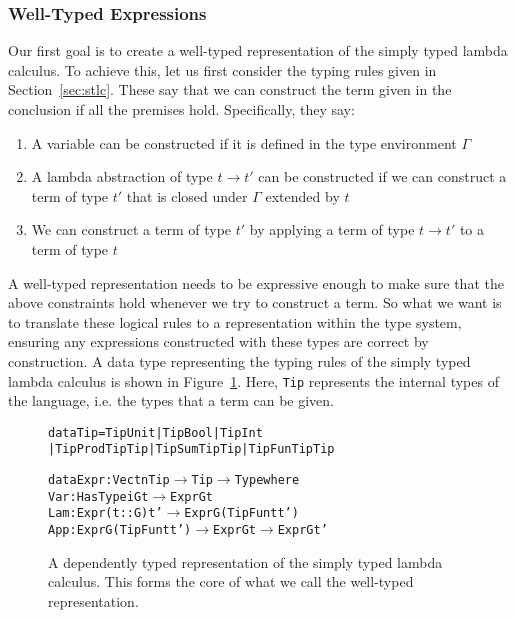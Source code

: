 \subsubsection{Well-Typed Expressions}

Our first goal is to create a well-typed representation of the simply typed lambda calculus. To achieve this, let us first consider the typing rules given in Section~\ref{sec:stlc}. These say that we can construct the term given in the conclusion if all the premises hold. Specifically, they say:

\begin{enumerate}
\item A variable can be constructed if it is defined in the type environment $\Gamma$
\item A lambda abstraction of type $t \to t'$ can be constructed if we can construct a term of type $t'$ that is closed under $\Gamma$ extended by $t$
\item We can construct a term of type $t'$ by applying a term of type $t \to t'$ to a term of type $t$
\end{enumerate}

A well-typed representation needs to be expressive enough to make sure that the above constraints hold whenever we try to construct a term. So what we want is to translate these logical rules to a representation within the type system, ensuring any expressions constructed with these types are correct by construction. A data type representing the typing rules of the simply typed lambda calculus is shown in Figure~\ref{fig:well-typed-stlc}. Here, \texttt{Tip} represents the internal types of the language, i.e. the types that a term can be given.

\begin{figure}
\begin{alltt}
  data Tip = TipUnit | TipBool | TipInt 
           | TipProd Tip Tip | TipSum Tip Tip | TipFun Tip Tip

  data Expr : Vect n Tip \(\rightarrow\) Tip \(\rightarrow\) Type where
    Var : HasType i G t \(\rightarrow\) Expr G t
    Lam : Expr (t :: G) t' \(\rightarrow\) Expr G (TipFun t t')
    App : Expr G (TipFun t t') \(\rightarrow\) Expr G t \(\rightarrow\) Expr G t'
\end{alltt}
\caption{A dependently typed representation of the simply typed lambda calculus. This forms the core of what we call the well-typed representation.}
\label{fig:well-typed-stlc}
\end{figure}

